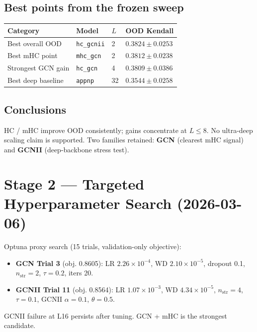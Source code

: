 \documentclass[11pt,a4paper]{article}
\begin{document}
\subsection{Best points from the frozen sweep}
\begin{table}[h]
\centering
\begin{tabular}{L{4.5cm} L{2.5cm} C{1.2cm} R{3.5cm}}
\toprule
Category & Model & $L$ & OOD Kendall \\
\midrule
Best overall OOD     & \texttt{hc\_gcnii}  & 2 & $0.3824 \pm 0.0253$ \\
Best mHC point       & \texttt{mhc\_gcn}   & 2 & $0.3812 \pm 0.0238$ \\
Strongest GCN gain   & \texttt{hc\_gcn}    & 4 & $0.3809 \pm 0.0386$ \\
Best deep baseline   & \texttt{appnp}      & 32 & $0.3544 \pm 0.0258$ \\
\bottomrule
\end{tabular}
\end{table}

\subsection{Conclusions}
HC / mHC improve OOD consistently; gains concentrate at $L \leq 8$.
No ultra-deep scaling claim is supported.
Two families retained: \textbf{GCN} (clearest mHC signal)
and \textbf{GCNII} (deep-backbone stress test).

\section{Stage 2 --- Targeted Hyperparameter Search (2026-03-06)}

Optuna proxy search (15 trials, validation-only objective):

\begin{itemize}
  \item \textbf{GCN Trial 3} (obj. 0.8605): LR $2.26\times10^{-4}$,
        WD $2.10\times10^{-5}$, dropout 0.1, $n_\text{str}=2$,
        $\tau=0.2$, iters 20.
  \item \textbf{GCNII Trial 11} (obj. 0.8564): LR $1.07\times10^{-3}$,
        WD $4.34\times10^{-5}$, $n_\text{str}=4$, $\tau=0.1$,
        GCNII $\alpha=0.1$, $\theta=0.5$.
\end{itemize}

GCNII failure at L16 persists after tuning.
GCN + mHC is the strongest candidate.
\end{document}
